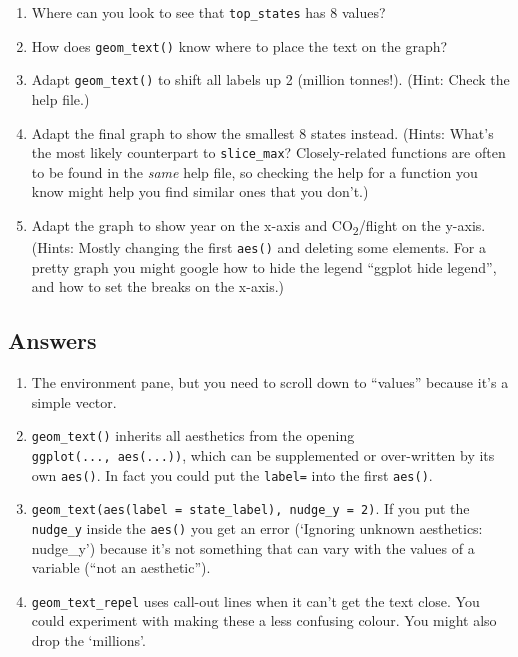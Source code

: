 \documentclass[
]{book}
\providecommand{\tightlist}{%
  \setlength{\itemsep}{0pt}\setlength{\parskip}{0pt}}
\begin{document}
\begin{enumerate}
\def\labelenumi{\arabic{enumi})}
\tightlist
\item
  Where can you look to see that \texttt{top\_states} has 8 values?
\item
  How does \texttt{geom\_text()} know where to place the text on the graph?
\item
  Adapt \texttt{geom\_text()} to shift all labels up 2 (million tonnes!). (Hint: Check the help file.)
\item
  Adapt the final graph to show the smallest 8 states instead. (Hints: What's the most likely counterpart to \texttt{slice\_max}? Closely-related functions are often to be found in the \emph{same} help file, so checking the help for a function you know might help you find similar ones that you don't.)
\item
  Adapt the graph to show year on the x-axis and CO\textsubscript{2}/flight on the y-axis. (Hints: Mostly changing the first \texttt{aes()} and deleting some elements. For a pretty graph you might google how to hide the legend ``ggplot hide legend'', and how to set the breaks on the x-axis.)
\end{enumerate}

\hypertarget{answers-2}{%
\subsection{Answers}\label{answers-2}}

\begin{enumerate}
\def\labelenumi{\arabic{enumi})}
\tightlist
\item
  The environment pane, but you need to scroll down to ``values'' because it's a simple vector.
\item
  \texttt{geom\_text()} inherits all aesthetics from the opening \texttt{ggplot(...,\ aes(...))}, which can be supplemented or over-written by its own \texttt{aes()}. In fact you could put the \texttt{label=} into the first \texttt{aes()}.
\item
  \texttt{geom\_text(aes(label\ =\ state\_label),\ nudge\_y\ =\ 2)}. If you put the \texttt{nudge\_y} inside the \texttt{aes()} you get an error (`Ignoring unknown aesthetics: nudge\_y') because it's not something that can vary with the values of a variable (``not an aesthetic'').
\item
  \texttt{geom\_text\_repel} uses call-out lines when it can't get the text close. You could experiment with making these a less confusing colour. You might also drop the `millions'.
\end{enumerate}
\end{document}
